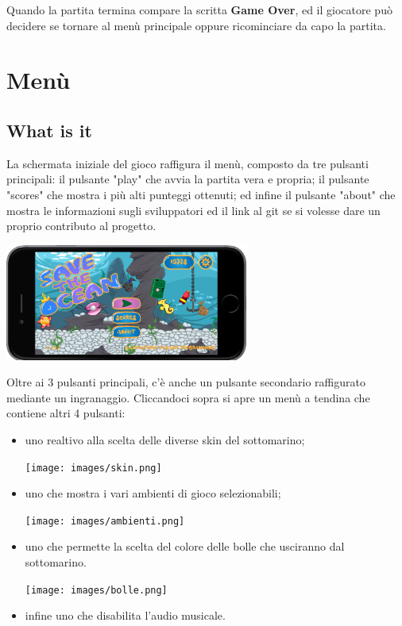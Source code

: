 \documentclass[15pt]{article}
\begin{document}
Quando la partita termina compare la scritta \textbf{Game Over}, 
ed il giocatore può decidere se tornare al menù principale oppure ricominciare da capo la partita.


\section{Menù}

\subsection{What is it}
La schermata iniziale del gioco raffigura il menù, 
composto da tre pulsanti principali: il pulsante "play" che avvia la partita vera e propria; 
il pulsante "scores" che mostra i più alti punteggi ottenuti; 
ed infine il pulsante "about" che mostra le informazioni sugli sviluppatori
ed il link al git se si volesse dare un proprio contributo al progetto. 


\begin{center}
\includegraphics[width=80mm]{images/menu.png}
\end{center}

Oltre ai 3 pulsanti principali, 
c'è anche un pulsante secondario raffigurato mediante un ingranaggio.
Cliccandoci sopra si apre un menù a tendina che contiene altri 4 pulsanti:

\begin{itemize}
    \item uno realtivo alla scelta delle diverse skin del sottomarino; 
    \begin{center}
    \texttt{[image: images/skin.png]}
    \end{center}

    \item uno che mostra i vari ambienti di gioco selezionabili; 
    \begin{center}
    \texttt{[image: images/ambienti.png]}
    \end{center}

    \item uno che permette la scelta del colore delle bolle che usciranno dal sottomarino.
    \begin{center}
    \texttt{[image: images/bolle.png]}
    \end{center}

    \item infine uno che disabilita l'audio musicale.
\end{itemize}
\end{document}
